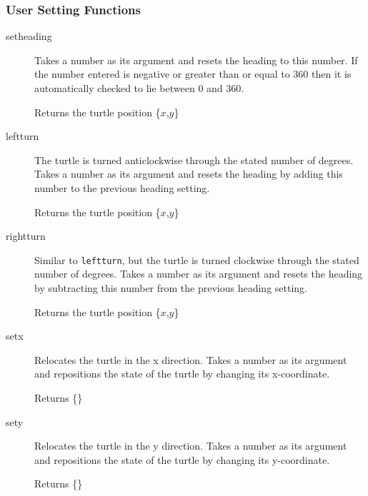 \subsubsection{User Setting Functions}
\begin{description}
 \item[setheading] Takes a number as its argument and resets the heading
       to this number. If the number entered is negative or greater than
       or equal to 360 then it is automatically checked to lie between 0
       and 360.

       Returns the turtle position \{$x$,$y$\}


 \item[leftturn]  The turtle is turned anticlockwise through the
       stated number of degrees. Takes a number as its argument and
       resets the heading by adding this number to the previous heading
       setting.

       Returns the turtle position \{$x$,$y$\}


 \item[rightturn] Similar to \texttt{leftturn}, but the turtle is turned
       clockwise through the stated number of degrees. Takes a number as
       its argument and resets the heading by subtracting this number from
       the previous heading setting.

       Returns the turtle position \{$x$,$y$\}


 \item[setx] Relocates the turtle in the x direction. Takes a number as
       its argument and repositions the state of the turtle by changing its
       x-coordinate.

       Returns \{\}


 \item[sety] Relocates the turtle in the y direction. Takes a number as
       its argument and repositions the state of the turtle by changing its
       y-coordinate.

       Returns \{\}



\end{description}
